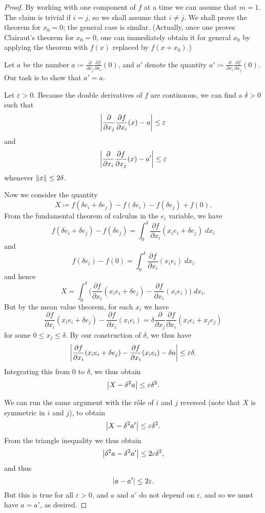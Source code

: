 \begin{proof}
    By working with one component of \(f\) at a time we can assume that \(m = 1\).
    The claim is trivial if \(i = j\), so we shall assume that \(i \neq j\).
    We shall prove the theorem for \(x_0 = 0\);
    the general case is similar.
    (Actually, once one proves Clairaut's theorem for \(x_0 = 0\), one can immediately obtain it for general \(x_0\) by applying the theorem with \(f(x)\) replaced by \(f(x + x_0)\).)

    Let \(a\) be the number \(a \coloneqq \frac{\partial}{\partial x_j} \frac{\partial f}{\partial x_i}(0)\), and \(a'\) denote the quantity \(a' \coloneqq \frac{\partial}{\partial x_i} \frac{\partial f}{\partial x_j}(0)\).
    Our task is to show that \(a' = a\).

    Let \(\varepsilon > 0\).
    Because the double derivatives of \(f\) are continuous, we can find a \(\delta > 0\) such that
    \[
        \abs{\frac{\partial}{\partial x_j} \frac{\partial f}{\partial x_i}(x) - a} \leq \varepsilon
    \]
    and
    \[
        \abs{\frac{\partial}{\partial x_i} \frac{\partial f}{\partial x_j}(x) - a'} \leq \varepsilon
    \]
    whenever \(\norm*{x} \leq 2\delta\).

    Now we consider the quantity
    \[
        X \coloneqq f(\delta e_i + \delta e_j) - f(\delta e_i) - f(\delta e_j) + f(0).
    \]
    From the fundamental theorem of calculus in the \(e_i\) variable, we have
    \[
        f(\delta e_i + \delta e_j) - f(\delta e_j) = \int_0^{\delta} \frac{\partial f}{\partial x_i}(x_i e_i + \delta e_j) \; d x_i
    \]
    and
    \[
        f(\delta e_i) - f(0) = \int_0^{\delta} \frac{\partial f}{\partial x_i}(x_i e_i) \; d x_i
    \]
    and hence
    \[
        X = \int_0^{\delta} \bigg(\frac{\partial f}{\partial x_i} (x_i e_i + \delta e_j) - \frac{\partial f}{\partial x_i} (x_i e_i)\bigg) \; d x_i.
    \]
    But by the mean value theorem, for each \(x_i\) we have
    \[
        \frac{\partial f}{\partial x_i} (x_i e_i + \delta e_j) - \frac{\partial f}{\partial x_i} (x_i e_i) = \delta \frac{\partial}{\partial x_j} \frac{\partial f}{\partial x_i} (x_i e_i + x_j e_j)
    \]
    for some \(0 \leq x_j \leq \delta\).
    By our construction of \(\delta\), we thus have
    \[
        \abs{\frac{\partial f}{\partial x_i} (x_i e_i + \delta e_j) - \frac{\partial f}{\partial x_i} (x_i e_i) - \delta a} \leq \varepsilon \delta.
    \]
    Integrating this from \(0\) to \(\delta\), we thus obtain
    \[
        \abs{X - \delta^2 a} \leq \varepsilon \delta^2.
    \]

    We can run the same argument with the rôle of \(i\) and \(j\) reversed (note that \(X\) is symmetric in \(i\) and \(j\)), to obtain
    \[
        \abs{X - \delta^2 a'} \leq \varepsilon \delta^2.
    \]
    From the triangle inequality we thus obtain
    \[
        \abs{\delta^2 a - \delta^2 a'} \leq 2 \varepsilon \delta^2,
    \]
    and thus
    \[
        \abs{a - a'} \leq 2 \varepsilon.
    \]
    But this is true for all \(\varepsilon > 0\), and \(a\) and \(a'\) do not depend on \(\varepsilon\), and so we must have \(a = a'\), as desired.
\end{proof}

